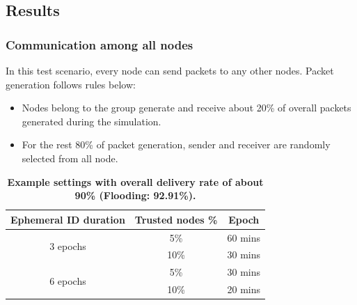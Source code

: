 \documentclass[11pt]{article}
\begin{document}
\clearpage
\subsection{Results}


\subsubsection{Communication among all nodes}
In this test scenario, every node can send packets to any other nodes.
Packet generation follows rules below:
\begin{itemize}
\item Nodes belong to the group generate and receive about 20\% of overall packets generated during the simulation. 
\item For the rest 80\% of packet generation, sender and receiver are randomly selected from all node. 
\end{itemize}



\begin{table}[!h]
\center
\begin{tabular}[!h]{|c|c|c|}
\hline
Ephemeral ID duration	& Trusted nodes \%	& Epoch	\\	
\hline
\hline
\multirow{2}{*}{3 epochs}	& 5\%				& 60 mins	\\
							& 10\%				& 30 mins	\\
\hline
\multirow{2}{*}{6 epochs}	& 5\%			& 30 mins \\
							& 10\%			& 20 mins \\
\hline
\end{tabular}
\vspace{10pt}
\caption{{ \bf Example settings with overall delivery rate of about 90\% (Flooding: 92.91\%).}}
\label{tab:dataset_summary}
\end{table}
\end{document}
